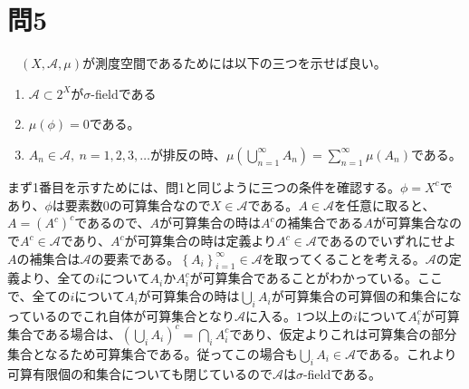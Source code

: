 \documentclass{article}
\begin{document}
\section{問5}
　$\left( X, \mathcal{A}, \mu \right)$が測度空間であるためには以下の三つを示せば良い。
\begin{enumerate}
	\item $\mathcal{A} \subset 2^X$が$\sigma$-fieldである
	\item $\mu(\phi) = 0$である。
	\item $A_n \in \mathcal{A},\ n = 1,2,3,\dots$が排反の時、$\mu\left( \bigcup_{n = 1}^{\infty} A_n \right) = \sum_{n = 1}^{\infty} \mu\left( A_n \right)$である。
\end{enumerate}

まず1番目を示すためには、問1と同じように三つの条件を確認する。$\phi = X^c$であり、$\phi$は要素数$0$の可算集合なので$X \in \mathcal{A}$である。$A \in \mathcal{A}$を任意に取ると、$A = (A^c)^c$であるので、$A$が可算集合の時は$A^c$の補集合である$A$が可算集合なので$A^c \in \mathcal{A}$であり、$A^c$が可算集合の時は定義より$A^c \in \mathcal{A}$であるのでいずれにせよ$A$の補集合は$\mathcal{A}$の要素である。$\left\{ A_i \right\}_{i = 1}^{\infty} \in \mathcal{A}$を取ってくることを考える。$\mathcal{A}$の定義より、全ての$i$について$A_i$か$A_i^c$が可算集合であることがわかっている。ここで、全ての$i$について$A_i$が可算集合の時は$\bigcup_i A_i$が可算集合の可算個の和集合になっているのでこれ自体が可算集合となり$\mathcal{A}$に入る。$1$つ以上の$i$について$A_i^c$が可算集合である場合は、$\left( \bigcup_i A_i\right)^c = \bigcap_i A_i^c$であり、仮定よりこれは可算集合の部分集合となるため可算集合である。従ってこの場合も$ \bigcup_i A_i \in \mathcal{A}$である。これより可算有限個の和集合についても閉じているので$\mathcal{A}$は$\sigma$-fieldである。
\end{document}
